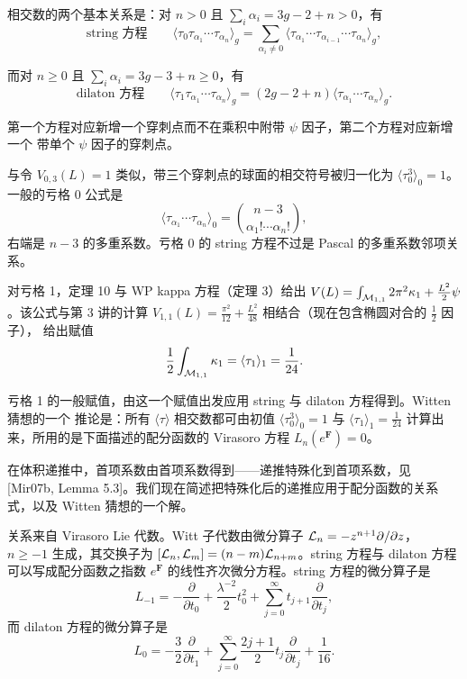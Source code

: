 相交数的两个基本关系是：对 $n>0$ 且 $\sum_i\alpha_i=3g-2+n>0$，有
\[
\text{string 方程}\qquad
\langle\tau_0\tau_{\alpha_1}\cdots\tau_{\alpha_n}\rangle_g
=\sum_{\alpha_i\neq 0}\langle\tau_{\alpha_1}\cdots\tau_{\alpha_{i-1}}\cdots\tau_{\alpha_n}\rangle_g,
\]

而对 $n\ge 0$ 且 $\sum_i\alpha_i=3g-3+n\ge 0$，有
\[
\text{dilaton 方程}\qquad
\langle\tau_1\tau_{\alpha_1}\cdots\tau_{\alpha_n}\rangle_g
=(2g-2+n)\langle\tau_{\alpha_1}\cdots\tau_{\alpha_n}\rangle_g.
\]

第一个方程对应新增一个穿刺点而不在乘积中附带 $\psi$ 因子，第二个方程对应新增一个
带单个 $\psi$ 因子的穿刺点。

与令 $V_{0,3}(L)=1$ 类似，带三个穿刺点的球面的相交符号被归一化为 $\langle\tau_0^3\rangle_0=1$。
一般的亏格 0 公式是
\[
\langle\tau_{\alpha_1}\cdots\tau_{\alpha_n}\rangle_0
=\binom{n-3}{\alpha_1!\cdots\alpha_n!},
\]
右端是 $n-3$ 的多重系数。亏格 0 的 string 方程不过是 Pascal 的多重系数邻项关系。

对亏格 1，定理 10 与 WP kappa 方程（定理 3）给出
$V(L)=\int_{\mathcal{M}_{1,1}}2\pi^2\kappa_1+\frac{L^2}{2}\psi$。该公式与第 3 讲的计算
$V_{1,1}(L)=\frac{\pi^2}{12}+\frac{L^2}{48}$ 相结合（现在包含椭圆对合的 $\frac12$ 因子），
给出赋值
\[
\frac12\int_{\mathcal{M}_{1,1}}\kappa_1=\langle\tau_1\rangle_1=\frac{1}{24}.
\]


亏格 1 的一般赋值，由这一个赋值出发应用 string 与 dilaton 方程得到。Witten 猜想的一个
推论是：所有 $\langle\tau\rangle$ 相交数都可由初值 $\langle\tau_0^3\rangle_0=1$ 与
$\langle\tau_1\rangle_1=\frac{1}{24}$ 计算出来，所用的是下面描述的配分函数的 Virasoro 方程
$L_n(e^{\mathbf F})=0$。

在体积递推中，首项系数由首项系数得到——递推特殊化到首项系数，见
[Mir07b, Lemma 5.3]。我们现在简述把特殊化后的递推应用于配分函数的关系式，以及
Witten 猜想的一个解。

关系来自 Virasoro Lie 代数。Witt 子代数由微分算子 $\mathcal{L}_n=-z^{n+1}\partial/\partial z$，
$n\ge-1$ 生成，其交换子为 $[\mathcal{L}_n,\mathcal{L}_m]=(n-m)\mathcal{L}_{n+m}$。string 方程与 dilaton 方程
可以写成配分函数之指数 $e^{\mathbf F}$ 的线性齐次微分方程。string 方程的微分算子是
\[
L_{-1}=-\frac{\partial}{\partial t_0}+\frac{\lambda^{-2}}{2}t_0^2
+\sum_{j=0}^{\infty}t_{j+1}\frac{\partial}{\partial t_j},
\]
而 dilaton 方程的微分算子是
\[
L_0=-\frac{3}{2}\frac{\partial}{\partial t_1}
+\sum_{j=0}^{\infty}\frac{2j+1}{2}t_j\frac{\partial}{\partial t_j}+\frac{1}{16}.
\]
